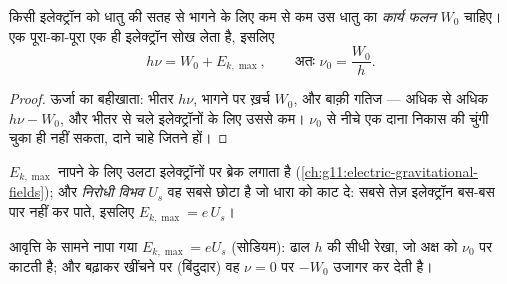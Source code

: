 \begin{theorem}[आइंस्टाइन का प्रकाश-विद्युत संबंध]\label{thm:g12:quantum-world:einstein}
किसी इलेक्ट्रॉन को धातु की सतह से भागने के लिए कम
से कम उस धातु का \emph{कार्य फलन} $W_0$ चाहिए। एक
 पूरा-का-पूरा एक ही इलेक्ट्रॉन सोख लेता है, इसलिए
\[
h\nu = W_0 + E_{k,\max}, \qquad \text{अतः } \nu_0 = \frac{W_0}{h}.
\]
\end{theorem}

\begin{proof}
ऊर्जा का बहीखाता: भीतर $h\nu$, भागने पर ख़र्च $W_0$, और बाक़ी गतिज ---
अधिक से अधिक $h\nu - W_0$, और भीतर से चले इलेक्ट्रॉनों के लिए उससे कम। $\nu_0$ से नीचे
एक दाना निकास की चुंगी चुका ही नहीं सकता, दाने चाहे जितने हों।
\end{proof}

\begin{definition}[निरोधी विभव]\label{def:g12:quantum-world:stopping}
$E_{k,\max}$ नापने के लिए उलटा  इलेक्ट्रॉनों पर ब्रेक लगाता है
(\cref{ch:g11:electric-gravitational-fields}); और \emph{निरोधी विभव} $U_s$ वह सबसे छोटा
 है जो धारा को काट दे: सबसे तेज़ इलेक्ट्रॉन बस-बस पार नहीं कर
पाते, इसलिए $E_{k,\max} = e\,U_s$।
\end{definition}

\begin{omfigure}

{\small आवृत्ति के सामने नापा गया $E_{k,\max} = eU_s$ (सोडियम): ढाल $h$ की सीधी
रेखा, जो अक्ष को $\nu_0$ पर काटती है; और बढ़ाकर खींचने पर (बिंदुदार) वह $\nu = 0$
पर $-W_0$ उजागर कर देती है।}
\end{omfigure}

